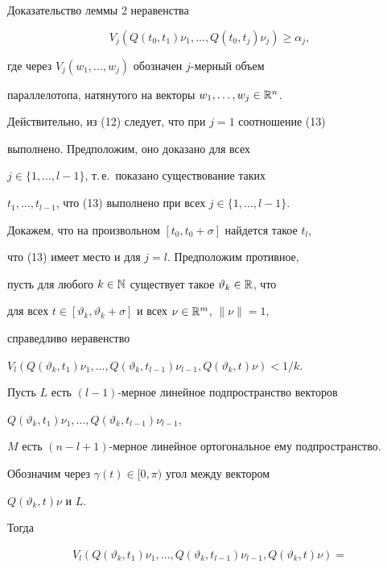 \begin{pf*}{Доказательство леммы 2}
неравенства


\begin{equation}


V_{j}(Q(t_{0},t_{1})\nu_{1},\dotsc,Q(t_{0},t_{j})\nu_{j})\ge\alpha_{j},


\end{equation}


где через $V_{j}(w_{1},\dotsc,w_{j})$ обозначен $j$-мерный объем


параллелотопа, натянутого на векторы $w_{1},\dotsc,w_{j}\in\Bbb R^n$.





Действительно, из (12) следует, что при $j=1$ соотношение (13)


выполнено. Предположим, оно доказано для всех


$j\in\{1,\dotsc,l-1\}$, т.\,е.~показано существование таких


$t_{1},\dotsc,t_{l-1}$, что (13) выполнено при всех $j\in\{1,\dotsc,l-1\}$.


Докажем, что на произвольном $[t_{0},t_{0}+\sigma]$ найдется такое $t_{l}$,


что (13) имеет место и для $j=l$. Предположим противное,


пусть для любого $k\in\Bbb N$ существует такое $\vartheta_{k}\in\Bbb R$, что


для всех $t\in[\vartheta_{k},\vartheta_{k}+\sigma]$ и всех $\nu\in\Bbb R^m$, $\|\nu\|=1$,


справедливо неравенство


$V_{l}(Q(\vartheta_{k},t_{1})\nu_{1},\dotsc,


Q(\vartheta_{k},t_{l-1})\nu_{l-1},Q(\vartheta_{k},t)\nu)<1/k$.


Пусть $L$ есть $(l-1)$-мерное линейное подпространство векторов


$Q(\vartheta_{k},t_{1})\nu_{1},\dotsc,Q(\vartheta_{k},t_{l-1})\nu_{l-1}$,


$M$ есть $(n-l+1)$-мерное линейное ортогональное ему подпространство.


Обозначим через $\gamma(t)\in[0,\pi)$ угол между вектором


$Q(\vartheta_{k},t)\nu$ и $L$.


Тогда


\begin{multline*}


V_{l}(Q(\vartheta_{k},t_{1})\nu_{1},\dotsc,


Q(\vartheta_{k},t_{l-1})\nu_{l-1},Q(\vartheta_{k},t)\nu)=\\



\end{multline*}
\end{pf*}
